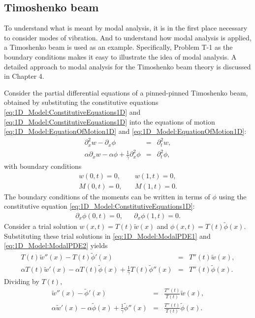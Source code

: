 \documentclass[../../main.tex]{subfiles}
\begin{document}
\subsection{Timoshenko beam}\label{subsec:Timoshenko_Modal_Analsis}
To understand what is meant by modal analysis, it is in the first place necessary to consider modes of vibration. And to understand how modal analysis is applied, a Timoshenko beam is used as an example. Specifically, Problem T-1 as the boundary conditions makes it easy to illustrate the idea of modal analysis. A detailed approach to modal analysis for the Timoshenko beam theory is discussed in Chapter 4.


Consider the partial differential equations of a pinned-pinned Timoshenko beam, obtained by substituting the constitutive equations \eqref{eq:1D_Model:ConstitutiveEquations1D} and \eqref{eq:1D_Model:ConstitutiveEquations1D} into the equations of motion \eqref{eq:1D_Model:EquationOfMotion1D} and \eqref{eq:1D_Model:EquationOfMotion1D}:
\begin{eqnarray}
	  \partial^2_{x} w - \partial_{x}\phi &=& \partial^{2}_{t} w, \label{eq:1D_Model:ModalPDE1}\\
	  \alpha\partial_{x} w - \alpha\phi + \frac{1}{\gamma}\partial^2_{x}\phi &=&  \partial^{2}_{t} \phi,\label{eq:1D_Model:ModalPDE2}
\end{eqnarray}
with boundary conditions
\begin{eqnarray*} 
	w(0,t) = 0, & &	\	 w(1,t) = 0, \label{eq:1D_Model:ModalBC1}\\
	M(0,t) = 0, & &	\	M(1,t) = 0. \label{eq:1D_Model:ModalBC2}
\end{eqnarray*}
The boundary conditions of the moments can be written in terms of $\phi$ using the constitutive equation \eqref{eq:1D_Model:ConstitutiveEquations1D}:
\begin{eqnarray*}
	\partial_{x}\phi(0,t) = 0, & & \partial_{x}\phi(1,t) = 0. \label{MA_4}
\end{eqnarray*}
Consider a trial solution $w(x,t) = T(t)\tilde{w}(x)$ and $\phi(x,t) = T(t)\tilde{\phi}(x)$. Substituting these trial solutions in \eqref{eq:1D_Model:ModalPDE1} and \eqref{eq:1D_Model:ModalPDE2} yields
\begin{eqnarray*}
	T(t)\tilde{w}''(x) - T(t)\tilde{\phi}'(x) &=& T''(t)\tilde{w}(x),\\
	  \alpha T(t)\tilde{w}'(x) - \alpha T(t)\tilde{\phi}(x) + \frac{1}{\gamma}T(t)\tilde{\phi}''(x) &=&  T''(t)\tilde{\phi}(x).
\end{eqnarray*}
Dividing by $T(t)$,
\begin{eqnarray*}
	\tilde{w}''(x) - \tilde{\phi}'(x) &=& \frac{T''(t)}{T(t)}\tilde{w}(x),\\
	  \alpha \tilde{w}'(x) - \alpha \tilde{\phi}(x) + \frac{1}{\gamma}\tilde{\phi}''(x) &=&  \frac{T''(t)}{T(t)}\tilde{\phi}(x).
\end{eqnarray*}
\end{document}
